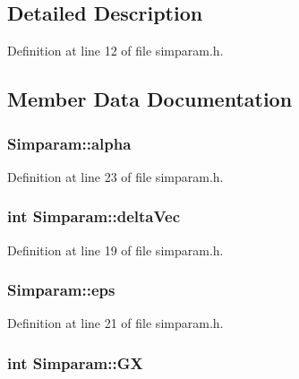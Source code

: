 \subsection{Detailed Description}


Definition at line 12 of file simparam.\-h.



\subsection{Member Data Documentation}
\hypertarget{struct_simparam_a4dd0e3b3cd66c2b3ae18df07f28ea2b5}{
\subsubsection[{alpha}]{ Simparam\-::alpha}}\label{d6/d1d/struct_simparam_a4dd0e3b3cd66c2b3ae18df07f28ea2b5}


Definition at line 23 of file simparam.\-h.

\hypertarget{struct_simparam_a695c2c299b4c8a474fdb76a85efdff81}{
\subsubsection[{delta\-Vec}]{\setlength{\rightskip}{0pt plus 5cm}int Simparam\-::delta\-Vec}}\label{d6/d1d/struct_simparam_a695c2c299b4c8a474fdb76a85efdff81}


Definition at line 19 of file simparam.\-h.

\hypertarget{struct_simparam_a8a477452247ad55e2d9ba2ad71cad937}{
\subsubsection[{eps}]{ Simparam\-::eps}}\label{d6/d1d/struct_simparam_a8a477452247ad55e2d9ba2ad71cad937}


Definition at line 21 of file simparam.\-h.

\hypertarget{struct_simparam_a59d3dcbf5156cb45608696f7f1d39393}{
\subsubsection[{G\-X}]{\setlength{\rightskip}{0pt plus 5cm}int Simparam\-::\-G\-X}}\label{d6/d1d/struct_simparam_a59d3dcbf5156cb45608696f7f1d39393}



